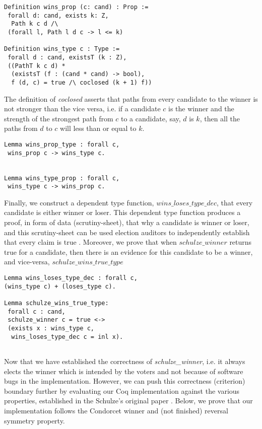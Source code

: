 \documentclass[compsoc,conference,a4paper,10pt,times]{IEEEtran}
\begin{document}
	  
\begin{verbatim}
Definition wins_prop (c: cand) : Prop := 
 forall d: cand, exists k: Z,
  Path k c d /\ 
 (forall l, Path l d c -> l <= k)
	 
Definition wins_type c : Type :=
 forall d : cand, existsT (k : Z),
 ((PathT k c d) *
  (existsT (f : (cand * cand) -> bool), 
  f (d, c) = true /\ coclosed (k + 1) f))
\end{verbatim}

\noindent
The definition of \textit{coclosed} asserts that
paths from every candidate to the winner 
is not stronger than the vice versa, i.e.
if a candidate $c$ is the winner and the strength 
of the strongest path from $c$ to a candidate,  say, $d$ is $k$, 
then all the paths from $d$ to $c$ will less than or equal to $k$.

\begin{verbatim}
Lemma wins_prop_type : forall c, 
 wins_prop c -> wins_type c.
   

Lemma wins_type_prop : forall c, 
 wins_type c -> wins_prop c.  
\end{verbatim}

\noindent
Finally, we construct a dependent type function, $wins\_loses\_type\_dec$, 
that every candidate is either winner or loser. This dependent type 
function produces a proof, in form of 
data (scrutiny-sheet), that why a candidate is winner or loser, and this 
scrutiny-sheet can be used election auditors to independently establish 
that every claim is true \cite{Arkoudas:2005:DRC}. Moreover,
we prove that when $schulze\_winner$ returns true for a candidate, then
there is an evidence for this candidate to be a winner, and vice-versa, 
$schulze\_wins\_true\_type$

\begin{verbatim}
Lemma wins_loses_type_dec : forall c, 
(wins_type c) + (loses_type c).

Lemma schulze_wins_true_type: 
 forall c : cand, 
 schulze_winner c = true <-> 
 (exists x : wins_type c, 
  wins_loses_type_dec c = inl x).


\end{verbatim}




Now that we have established the correctness of \textit{schulze\_winner},
i.e. it always elects the winner which is intended by the voters and 
not because of software bugs in the implementation. However, we can push this
correctness (criterion) boundary further by evaluating our Coq implementation against 
the various properties, established in the Schulze's 
original paper \cite{Schulze:2011:NMC}. Below, we prove that our 
implementation follows the Condorcet winner and (not finished)
reversal symmetry property. 
\end{document}
